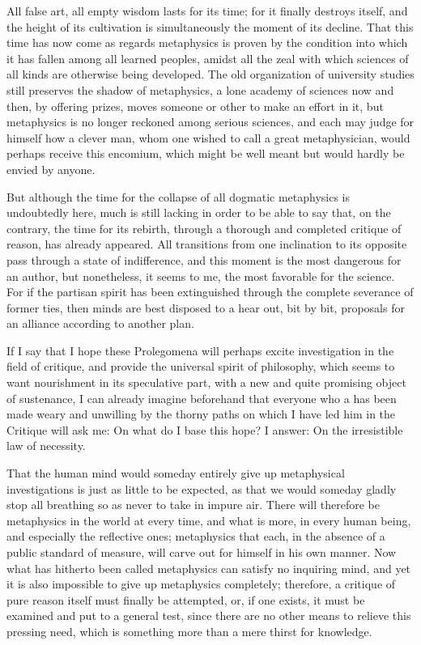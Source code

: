 All false art, all empty wisdom lasts for its time; for it ﬁnally destroys
itself, and the height of its cultivation is simultaneously the moment of its
decline. That this time has now come as regards metaphysics is proven by
the condition into which it has fallen among all learned peoples, amidst
all the zeal with which sciences of all kinds are otherwise being developed.
The old organization of university studies still preserves the shadow of
metaphysics, a lone academy of sciences now and then, by offering prizes,
moves someone or other to make an effort in it, but metaphysics is no
longer reckoned among serious sciences, and each may judge for himself
how a clever man, whom one wished to call a great metaphysician, would
perhaps receive this encomium, which might be well meant but would
hardly be envied by anyone.

But although the time for the collapse of all dogmatic metaphysics
is undoubtedly here, much is still lacking in order to be able to say
that, on the contrary, the time for its rebirth, through a thorough and
completed critique of reason, has already appeared. All transitions from
one inclination to its opposite pass through a state of indifference, and
this moment is the most dangerous for an author, but nonetheless, it
seems to me, the most favorable for the science. For if the partisan spirit
has been extinguished through the complete severance of former ties,
then minds are best disposed to a hear out, bit by bit, proposals for an
alliance according to another plan.

If I say that I hope these Prolegomena will perhaps excite investigation
in the ﬁeld of critique, and provide the universal spirit of philosophy,
which seems to want nourishment in its speculative part, with a new and
quite promising object of sustenance, I can already imagine beforehand
that everyone who a has been made weary and unwilling by the thorny
paths on which I have led him in the Critique will ask me: On what do I
base this hope? I answer: On the irresistible law of necessity.

That the human mind would someday entirely give up metaphysical
investigations is just as little to be expected, as that we would someday
gladly stop all breathing so as never to take in impure air. There will
therefore be metaphysics in the world at every time, and what is more,
in every human being, and especially the reﬂective ones; metaphysics
that each, in the absence of a public standard of measure, will carve
out for himself in his own manner. Now what has hitherto been called
metaphysics can satisfy no inquiring mind, and yet it is also impossible to
give up metaphysics completely; therefore, a critique of pure reason itself
must ﬁnally be attempted, or, if one exists, it must be examined and put
to a general test, since there are no other means to relieve this pressing
need, which is something more than a mere thirst for knowledge.

